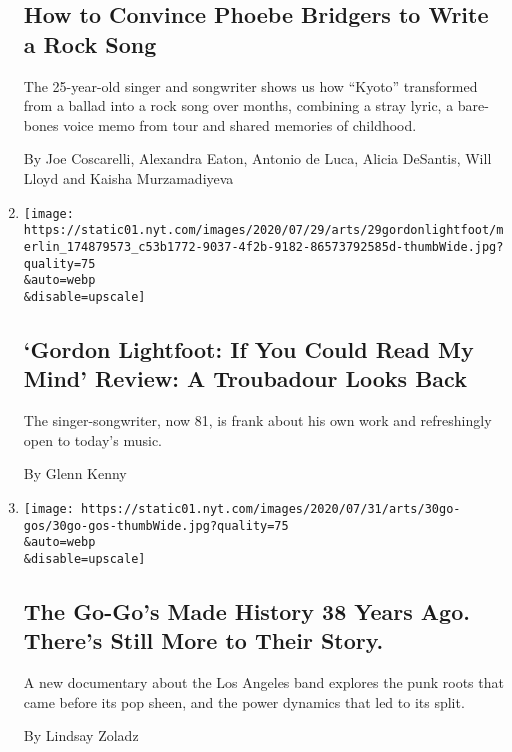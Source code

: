 \begin{enumerate}
  \hypertarget{how-to-convince-phoebe-bridgers-to-write-a-rock-song}{%
  \subsection{How to Convince Phoebe Bridgers to Write a Rock
  Song}\label{how-to-convince-phoebe-bridgers-to-write-a-rock-song}}

  The 25-year-old singer and songwriter shows us how ``Kyoto''
  transformed from a ballad into a rock song over months, combining a
  stray lyric, a bare-bones voice memo from tour and shared memories of
  childhood.

  By Joe Coscarelli, Alexandra Eaton, Antonio de Luca, Alicia DeSantis,
  Will Lloyd and Kaisha Murzamadiyeva
\item
  \href{/2020/07/29/movies/gordon-lightfoot-if-you-could-read-my-mind-review.html}{}

  \texttt{[image: https://static01.nyt.com/images/2020/07/29/arts/29gordonlightfoot/merlin\_174879573\_c53b1772-9037-4f2b-9182-86573792585d-thumbWide.jpg?quality=75\\\&auto=webp\\\&disable=upscale]}

  \hypertarget{gordon-lightfoot-if-you-could-read-my-mind-review-a-troubadour-looks-back}{%
  \subsection{`Gordon Lightfoot: If You Could Read My Mind' Review: A
  Troubadour Looks
  Back}\label{gordon-lightfoot-if-you-could-read-my-mind-review-a-troubadour-looks-back}}

  The singer-songwriter, now 81, is frank about his own work and
  refreshingly open to today's music.

  By Glenn Kenny
\item
  \href{/2020/07/29/arts/music/the-go-gos-documentary.html}{}

  \texttt{[image: https://static01.nyt.com/images/2020/07/31/arts/30go-gos/30go-gos-thumbWide.jpg?quality=75\\\&auto=webp\\\&disable=upscale]}

  \hypertarget{the-go-gos-made-history-38-years-ago-theres-still-more-to-their-story}{%
  \subsection{The Go-Go's Made History 38 Years Ago. There's Still More
  to Their
  Story.}\label{the-go-gos-made-history-38-years-ago-theres-still-more-to-their-story}}

  A new documentary about the Los Angeles band explores the punk roots
  that came before its pop sheen, and the power dynamics that led to its
  split.

  By Lindsay Zoladz
\end{enumerate}

